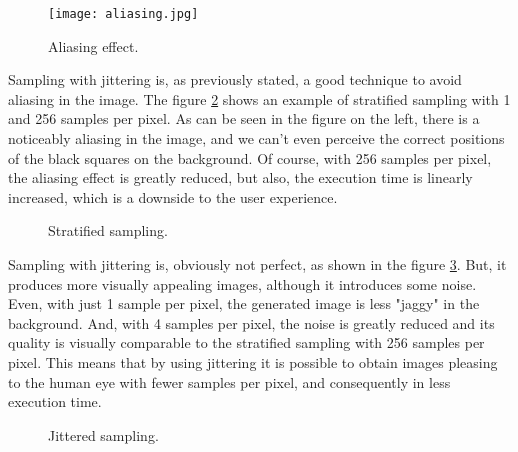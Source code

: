 \begin{figure}[H]
	\centering
	\caption{Aliasing effect.}
	\label{Aliased.}
	\texttt{[image: aliasing.jpg]}
\end{figure}


\par
Sampling with jittering is, as previously stated, a good technique to avoid aliasing in the image.
The figure \ref{Sampling_Stratified.} shows an example of stratified sampling with 1 and 256 samples per pixel.
As can be seen in the figure on the left, there is a noticeably aliasing in the image, and we can't even perceive the correct positions of the black squares on the background.
Of course, with 256 samples per pixel, the aliasing effect is greatly reduced, but also, the execution time is linearly increased, which is a downside to the user experience.

\begin{figure}[H]
	\centering
	\qquad
	\caption{Stratified sampling.}
	\label{Sampling_Stratified.}
\end{figure}

\par
Sampling with jittering is, obviously not perfect, as shown in the figure \ref{Sampling_Jittering.}.
But, it produces more visually appealing images, although it introduces some noise.
Even, with just 1 sample per pixel, the generated image is less "jaggy" in the background.
And, with 4 samples per pixel, the noise is greatly reduced and its quality is visually comparable to the stratified sampling with 256 samples per pixel.
This means that by using jittering it is possible to obtain images pleasing to the human eye with fewer samples per pixel, and consequently in less execution time.

\begin{figure}[H]
	\centering
	\qquad
	\caption{Jittered sampling.}
	\label{Sampling_Jittering.}
\end{figure}


